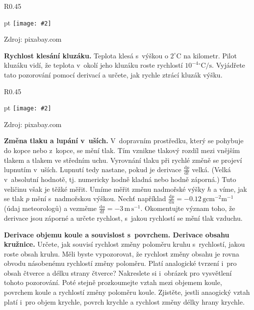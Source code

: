 \documentclass{article}
\newcommand\obrazek[2][pixabay.com]{
  \clearpage
\begin{wrapfigure}{R}{0.45\linewidth}
  \begin{minipage}{1.0\linewidth}\parskip 0 pt
  \texttt{[image: \#2]}

  \vspace*{-10pt}
  \null\hfill{\color{gray}\footnotesize Zdroj: #1}
    
  \end{minipage}
\end{wrapfigure}
}
\let\oldtextbf\textbf
\def\textbf#1{%
  \oldtextbf{\color{red} #1}}
\def\stranka{\newpage}
\begin{document}
\obrazek{kluzak.jpg}
\textbf{Rychlost klesání kluzáku.}
Teplota klesá s výškou o $2^\circ \mathrm C$ na kilometr. Pilot
kluzáku vidí, že teplota v okolí jeho kluzáku roste rychlostí
$10^{-4}{}^\circ \mathrm C/\mathrm{s}$. Vyjádřete tato pozorování pomocí
derivací a určete, jak rychle ztrácí kluzák výšku.

\obrazek{autobus.jpg} \textbf{Změna tlaku a lupání v uších.}
V dopravním prostředku, který se pohybuje do kopce nebo z kopce, se
mění tlak. Tím vznikne tlakový rozdíl mezi vnějším tlakem a tlakem ve
středním uchu. Vyrovnání tlaku při rychlé změně se projeví lupnutím
v uších.  Lupnutí tedy nastane, pokud je derivace
$\frac {\mathrm d p}{\mathrm dt}$ velká. (Velká v absolutní hodnotě,
tj. numericky hodně kladná nebo hodně záporná.)  Tuto veličinu však je
těžké měřit. Umíme měřit změnu nadmořské výšky $h$ a víme, jak se tlak
$p$ mění s nadmořskou výškou. Nechť například
$\frac{\mathrm dp}{\mathrm
  du}=-0.12\,\mathrm{g}\mathrm{cm}^{-2}\mathrm{m}^{-1}$ (údaj
meteorologů) a vezměme
$ \frac{\mathrm du}{\mathrm
  dt}=-3\,\mathrm{m}\,\mathrm{s}^{-1}$. Okomentujte význam toho, že
derivace jsou záporné a určete rychlost, s jakou rychlostí se mění
tlak vzduchu.

\stranka

\textbf{Derivace objemu koule a souvislost s povrchem. Derivace obsahu
  kružnice.}  Určete, jak souvisí rychlost změny poloměru kruhu
s rychlostí, jakou roste obsah kruhu. Měli byste vypozorovat, že
rychlost změny obsahu je rovna obvodu násobenému rychlostí změny
poloměru. Platí analogické tvrzení i pro obsah čtverce a délku strany
čtverce? Nakreslete si i obrázek pro vysvětlení tohoto
pozorování. Poté stejně prozkoumejte vztah mezi objemem koule,
povrchem koule a rychlostí změny poloměru koule. Zjistěte, jestli
anaogický vztah platí i pro objem krychle, povrch krychle a rychlost
změny délky hrany krychle.
\end{document}
